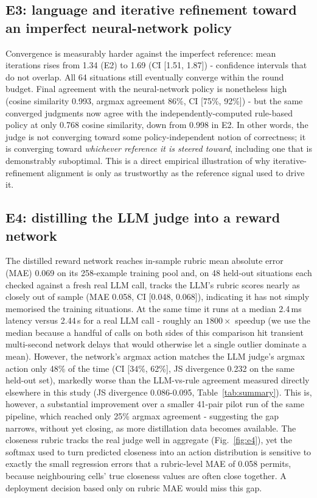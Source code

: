 \documentclass[conference]{IEEEtran}
\begin{document}
\subsection{E3: language and iterative refinement toward an imperfect
neural-network policy}
Convergence is measurably harder against the imperfect reference: mean
iterations rises from 1.34 (E2) to 1.69 (CI [1.51, 1.87]) - confidence
intervals that do not overlap. All 64 situations still eventually
converge within the round budget. Final agreement with the
neural-network policy is nonetheless high (cosine similarity 0.993,
argmax agreement 86\%, CI [75\%, 92\%]) - but the same converged
judgments now agree with the independently-computed rule-based policy
at only 0.768 cosine similarity, down from 0.998 in E2. In other words,
the judge is not converging toward some policy-independent notion of
correctness; it is converging toward \emph{whichever reference it is
steered toward}, including one that is demonstrably suboptimal. This is
a direct empirical illustration of why iterative-refinement alignment is
only as trustworthy as the reference signal used to drive it.

\subsection{E4: distilling the LLM judge into a reward network}
The distilled reward network reaches in-sample rubric mean absolute
error (MAE) 0.069 on its 258-example training pool and, on 48 held-out
situations each checked against a fresh real LLM call, tracks the LLM's
rubric scores nearly as closely out of sample (MAE 0.058, CI [0.048,
0.068]), indicating it has not simply memorised the training situations.
At the same time it runs at a median 2.4\,ms latency versus 2.44\,s for
a real LLM call - roughly an $1800\times$ speedup (we use the median
because a handful of calls on both sides of this comparison hit
transient multi-second network delays that would otherwise let a single
outlier dominate a mean). However, the network's argmax action matches
the LLM judge's argmax action only 48\% of the time (CI [34\%, 62\%], JS
divergence 0.232 on the same held-out set), markedly worse than the
LLM-vs-rule agreement measured directly elsewhere in this study (JS
divergence 0.086-0.095, Table~\ref{tab:summary}). This is, however, a
substantial improvement over a smaller 41-pair pilot run of the same
pipeline, which reached only 25\% argmax agreement - suggesting the gap
narrows, without yet closing, as more distillation data becomes
available. The closeness rubric tracks the real judge well in aggregate
(Fig.~\ref{fig:e4}), yet the softmax used to turn predicted closeness
into an action distribution is sensitive to exactly the small regression
errors that a rubric-level MAE of 0.058 permits, because neighbouring
cells' true closeness values are often close together. A deployment
decision based only on rubric MAE would miss this gap.
\end{document}

